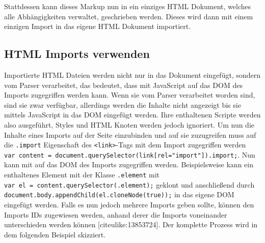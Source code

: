 Stattdessen kann dieses Markup nun in ein einziges HTML Dokument,
welches alle Abhängigkeiten verwaltet, geschrieben werden. Dieses wird
dann mit einem einzigen Import in das eigene HTML Dokument importiert.

\begin{Shaded}
\begin{Highlighting}[]
  \KeywordTok{>}
\end{Highlighting}
\end{Shaded}

\subsection{HTML Imports verwenden}\label{html-imports-verwenden}

Importierte HTML Dateien werden nicht nur in das Dokument eingefügt,
sondern vom Parser verarbeitet, das bedeutet, dass mit JavaScript auf
das DOM des Imports zugegriffen werden kann. Wenn sie vom Parser
verarbeitet worden sind, sind sie zwar verfügbar, allerdings werden die
Inhalte nicht angezeigt bis sie mittels JavaScript in das DOM eingefügt
werden. Ihre enthaltenen Scripte werden also ausgeführt, Styles und HTML
Knoten werden jedoch ignoriert. Um nun die Inhalte eines Imports auf der
Seite einzubinden und auf sie zuzugreifen muss auf die \texttt{.import}
Eigenschaft des \texttt{\textless{}link\textgreater{}}-Tags mit dem
Import zugegriffen werden
\texttt{var\ content\ =\ document.querySelector(\textquotesingle{}link{[}rel="import"{]}\textquotesingle{}).import;}.
Nun kann mit auf das DOM des Imports zugegriffen werden. Beispielsweise
kann ein enthaltenes Element mit der Klasse \texttt{.element} mit
\texttt{var\ el\ =\ content.querySelector(\textquotesingle{}.element\textquotesingle{});}
geklont und anschließend durch
\texttt{document.body.appendChild(el.cloneNode(true));} in das eigene
DOM eingefügt werden. Falls es nun jedoch mehrere Imports geben sollte,
können den Imports IDs zugewiesen werden, anhand derer die Imports
voneinander unterschieden werden können {[}citeulike:13853724{]}. Der
komplette Prozess wird in dem folgenden Beispiel skizziert.

